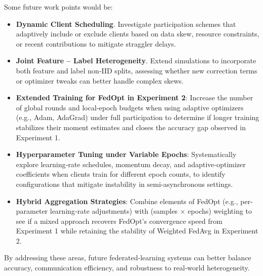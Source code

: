 \documentclass[11pt]{article}
\begin{document}
    Some future work points would be:
    \begin{itemize}
        \item \textbf{Dynamic Client Scheduling}. Investigate participation schemes that adaptively include or exclude clients based on data skew, resource constraints, or recent contributions to mitigate straggler delays.
        \item \textbf{Joint Feature -- Label Heterogeneity}. Extend simulations to incorporate both feature and label non‐IID splits, assessing whether new correction terms or optimizer tweaks can better handle complex skews.
        \item \textbf{Extended Training for FedOpt in Experiment 2}: Increase the number of global rounds and local‐epoch budgets when using adaptive optimizers (e.g., Adam, AdaGrad) under full participation to determine if longer training stabilizes their moment estimates and closes the accuracy gap observed in Experiment 1.
        \item \textbf{Hyperparameter Tuning under Variable Epochs}: Systematically explore learning‐rate schedules, momentum decay, and adaptive‐optimizer coefficients when clients train for different epoch counts, to identify configurations that mitigate instability in semi-asynchronous settings.
        \item \textbf{Hybrid Aggregation Strategies}: Combine elements of FedOpt (e.g., per‐parameter learning‐rate adjustments) with (samples $\times$ epochs) weighting to see if a mixed approach recovers FedOpt’s convergence speed from Experiment 1 while retaining the stability of Weighted FedAvg in Experiment 2.
    \end{itemize}

    By addressing these areas, future federated‐learning systems can better balance accuracy, communication efficiency, and robustness to real‐world heterogeneity.

    
    
\end{document}

